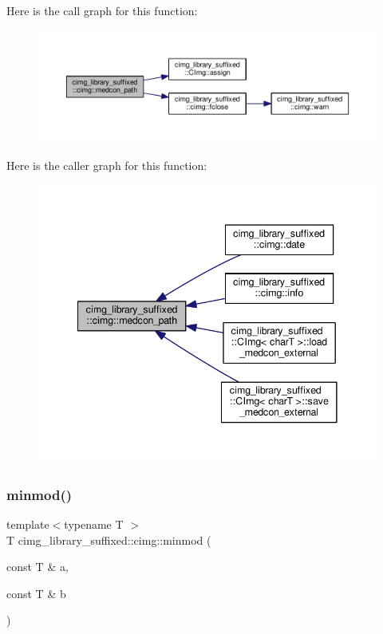 Here is the call graph for this function\+:
\nopagebreak
\begin{figure}[H]
\begin{center}
\leavevmode
\includegraphics[width=350pt]{d4/d9b/namespacecimg__library__suffixed_1_1cimg_a65c2f6f9671ac4f3eae2b5624313926e_cgraph}
\end{center}
\end{figure}
Here is the caller graph for this function\+:
\nopagebreak
\begin{figure}[H]
\begin{center}
\leavevmode
\includegraphics[width=341pt]{d4/d9b/namespacecimg__library__suffixed_1_1cimg_a65c2f6f9671ac4f3eae2b5624313926e_icgraph}
\end{center}
\end{figure}
\mbox{\label{namespacecimg__library__suffixed_1_1cimg_ac9630aa9259053d209c7ff02823efda0}} 
\subsubsection{\texorpdfstring{minmod()}{minmod()}}
{\footnotesize\ttfamily template$<$typename T $>$ \\
T cimg\+\_\+library\+\_\+suffixed\+::cimg\+::minmod (\begin{DoxyParamCaption}\item[{const T \&}]{a,  }\item[{const T \&}]{b }\end{DoxyParamCaption})\hspace{0.3cm}{\ttfamily [inline]}}



